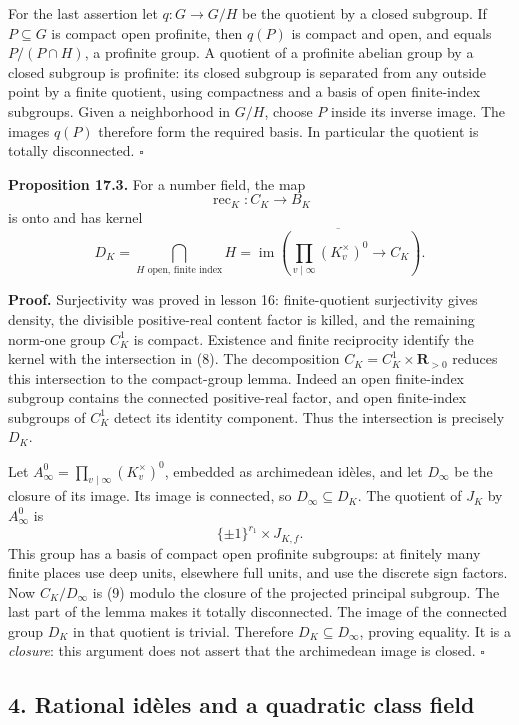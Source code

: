 \documentclass[11pt,a4paper]{article}
\begin{document}
For the last assertion let \(q:G\to G/H\) be the quotient by a closed
subgroup. If \(P\subseteq G\) is compact open profinite, then \(q(P)\)
is compact and open, and equals \(P/(P\cap H)\), a profinite group. A
quotient of a profinite abelian group by a closed subgroup is profinite:
its closed subgroup is separated from any outside point by a finite
quotient, using compactness and a basis of open finite-index subgroups.
Given a neighborhood in \(G/H\), choose \(P\) inside its inverse image.
The images \(q(P)\) therefore form the required basis. In particular the
quotient is totally disconnected. \(\square\)

\textbf{Proposition 17.3.} For a number field, the map \[
\operatorname{rec}_K:C_K\longrightarrow B_K
\] is onto and has kernel \[
D_K=\bigcap_{H\text{ open, finite index}}H
=\overline{\operatorname{im}\left(\prod_{v\mid\infty}(K_v^\times)^0\longrightarrow C_K\right)}.
\tag{8}
\]

\textbf{Proof.} Surjectivity was proved in lesson 16: finite-quotient
surjectivity gives density, the divisible positive-real content factor
is killed, and the remaining norm-one group \(C_K^1\) is compact.
Existence and finite reciprocity identify the kernel with the
intersection in (8). The decomposition \(C_K=C_K^1\times\mathbf R_{>0}\)
reduces this intersection to the compact-group lemma. Indeed an open
finite-index subgroup contains the connected positive-real factor, and
open finite-index subgroups of \(C_K^1\) detect its identity component.
Thus the intersection is precisely \(D_K\).

Let \(A_\infty^0=\prod_{v\mid\infty}(K_v^\times)^0\), embedded as
archimedean idèles, and let \(D_\infty\) be the closure of its image.
Its image is connected, so \(D_\infty\subseteq D_K\). The quotient of
\(J_K\) by \(A_\infty^0\) is \[
\{\pm1\}^{r_1}\times J_{K,f}.
\tag{9}
\] This group has a basis of compact open profinite subgroups: at
finitely many finite places use deep units, elsewhere full units, and
use the discrete sign factors. Now \(C_K/D_\infty\) is (9) modulo the
closure of the projected principal subgroup. The last part of the lemma
makes it totally disconnected. The image of the connected group \(D_K\)
in that quotient is trivial. Therefore \(D_K\subseteq D_\infty\),
proving equality. It is a \emph{closure}: this argument does not assert
that the archimedean image is closed. \(\square\)

\subsection{4. Rational idèles and a quadratic class
field}\label{rational-iduxe8les-and-a-quadratic-class-field}
\end{document}

